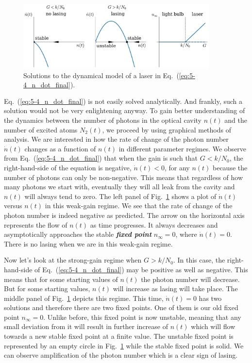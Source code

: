 \begin{figure}
    \centering
    \includegraphics[width=0.9\textwidth]{lesson5/5-4_lasing.pdf}
    \caption[Dynamical model of a laser]{Solutions to the dynamical model of a laser in Eq.~(\ref{eq:5-4_n_dot_final}).}
    \label{fig:5-4_lasing}
\end{figure}


Eq.~(\ref{eq:5-4_n_dot_final}) is not easily solved analytically.
And frankly, such a solution would not be very enlightening anyway.
To gain better understanding of the dynamics between the number of photons in the optical cavity $n(t)$ and the number of excited atoms $N_2(t)$, we proceed by using graphical methods of analysis.
We are interested in how the rate of change of the photon number $\dot{n}(t)$ changes as a function of $n(t)$ in different parameter regimes.
We observe from Eq.~(\ref{eq:5-4_n_dot_final}) that when the gain is such that $G < k / N_0$, the right-hand-side of the equation is negative, $\dot{n}(t) < 0$, for any $n(t)$ because the number of photons can only be non-negative.
This means that regardless of how many photons we start with, eventually they will all leak from the cavity and $n(t)$ will always tend to zero.
The left panel of Fig.~\ref{fig:5-4_lasing} shows a plot of $\dot{n}(t)$ versus $n(t)$ in this weak-gain regime.
We see that the rate of change of the photon number is indeed negative as predicted.
The arrow on the horizontal axis represents the flow of $n(t)$ as time progresses.
It always decreases and asymptotically approaches the stable \textit{\textbf{fixed point}} $n_{\infty} = 0$, where $\dot{n}(t) = 0$.
There is no lasing when we are in this weak-gain regime.

Now let's look at the strong-gain regime when $G > k / N_0$.
In this case, the right-hand-side of Eq.~(\ref{eq:5-4_n_dot_final}) may be positive as well as negative.
This means that for some starting values of $n(t)$ the photon number will decrease.
But for some starting values, $n(t)$ will increase as lasing will take place.
The middle panel of Fig.~\ref{fig:5-4_lasing} depicts this regime.
This time, $\dot{n}(t) = 0$ has two solutions and therefore there are two fixed points.
One of them is our old fixed point $n_{\infty} = 0$.
Unlike before, this fixed point is now unstable, meaning that any small deviation from it will result in further increase of $n(t)$ which will flow towards a new stable fixed point at a finite value.
The unstable fixed point is represented by an empty circle in Fig.~\ref{fig:5-4_lasing} while the stable fixed point is solid.
We can observe amplification of the photon number which is a clear sign of lasing.

